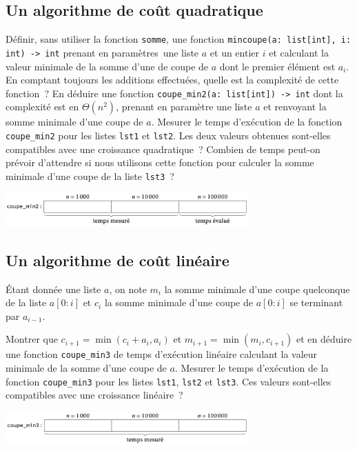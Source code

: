 \documentclass{magnoliaold}
\begin{document}
\subsection{Un algorithme de coût quadratique}

\begin{questions}
\question Définir, sans utiliser la fonction \verb!somme!, une fonction \verb!mincoupe(a: list[int], i: int) -> int!
  prenant en paramètres\ une liste $a$ et un entier $i$ et calculant la valeur minimale de la somme d'une de coupe de
  $a$ dont le premier élément est $a_i$. En comptant toujours les additions effectuées, quelle est la complexité
  de cette fonction~?
\question En déduire une fonction \verb!coupe_min2(a: list[int]) -> int! dont la complexité est en $\Theta(n^2)$,
  prenant en paramètre une liste $a$ et renvoyant la somme minimale d'une coupe de $a$.
\question Mesurer le temps d'exécution de la fonction \verb!coupe_min2! pour les listes \verb!lst1! et \verb!lst2!.
  Les deux valeurs obtenues sont-elles compatibles avec une croissance quadratique~? Combien de temps peut-on
  prévoir d'attendre si nous utilisons cette fonction pour calculer la somme minimale d'une coupe de la liste
  \verb!lst3!~?
  \begin{center}
    \includegraphics[width=0.7\textwidth]{../../commun/images/python-tp-coupe-2}
    \end{center} 
\end{questions}

\subsection{Un algorithme de coût linéaire}

Étant donnée une liste $a$, on note $m_i$ la somme minimale d'une coupe quelconque de la liste $a[0:i]$ et $c_i$
la somme minimale d'une coupe de $a[0:i]$ se terminant par $a_{i-1}$.
\begin{questions}
\question Montrer que $c_{i+1}=\min(c_i+a_i, a_i)$ et $m_{i+1}=\min(m_i, c_{i+1})$ et en déduire une fonction
  \verb!coupe_min3! de temps d'exécution linéaire calculant la valeur minimale de la somme d'une coupe de $a$.
\question Mesurer le temps d'exécution de la fonction \verb!coupe_min3! pour les listes \verb!lst1!, \verb!lst2!
  et \verb!lst3!. Ces valeurs sont-elles compatibles avec une croissance linéaire~?
  \begin{center}
    \includegraphics[width=0.7\textwidth]{../../commun/images/python-tp-coupe-3}
    \end{center} 
\end{questions}
\end{document}

